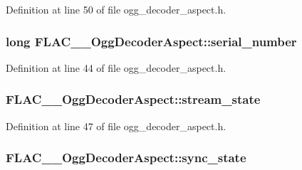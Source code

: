 Definition at line 50 of file ogg\+\_\+decoder\+\_\+aspect.\+h.

\subsubsection[{\texorpdfstring{serial\+\_\+number}{serial_number}}]{\setlength{\rightskip}{0pt plus 5cm}long F\+L\+A\+C\+\_\+\+\_\+\+Ogg\+Decoder\+Aspect\+::serial\+\_\+number}\hypertarget{struct_f_l_a_c_____ogg_decoder_aspect_a085a62e120d2adeb364251bf4a2787ac}{}\label{struct_f_l_a_c_____ogg_decoder_aspect_a085a62e120d2adeb364251bf4a2787ac}


Definition at line 44 of file ogg\+\_\+decoder\+\_\+aspect.\+h.

\subsubsection[{\texorpdfstring{stream\+\_\+state}{stream_state}}]{ F\+L\+A\+C\+\_\+\+\_\+\+Ogg\+Decoder\+Aspect\+::stream\+\_\+state}\hypertarget{struct_f_l_a_c_____ogg_decoder_aspect_aeb15a03099d9b0395313c7b80ac56252}{}\label{struct_f_l_a_c_____ogg_decoder_aspect_aeb15a03099d9b0395313c7b80ac56252}


Definition at line 47 of file ogg\+\_\+decoder\+\_\+aspect.\+h.

\subsubsection[{\texorpdfstring{sync\+\_\+state}{sync_state}}]{ F\+L\+A\+C\+\_\+\+\_\+\+Ogg\+Decoder\+Aspect\+::sync\+\_\+state}\hypertarget{struct_f_l_a_c_____ogg_decoder_aspect_af182109617349e8ba41fa975c7d234d1}{}\label{struct_f_l_a_c_____ogg_decoder_aspect_af182109617349e8ba41fa975c7d234d1}


